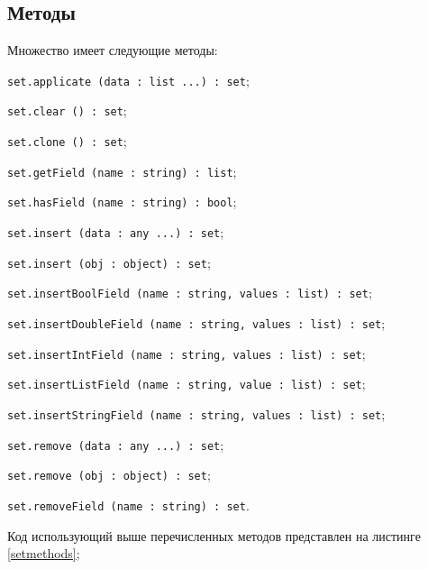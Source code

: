 \subsection{Методы}

Множество имеет следующие методы:
\begin{icItems}
\item \lstinline|set.applicate (data : list ...) : set|;
\item \lstinline|set.clear () : set|;
\item \lstinline|set.clone () : set|;
\item \lstinline|set.getField (name : string) : list|;
\item \lstinline|set.hasField (name : string) : bool|;
\item \lstinline|set.insert (data : any ...) : set|;
\item \lstinline|set.insert (obj : object) : set|;
\item \lstinline|set.insertBoolField (name : string, values : list) : set|;
\item \lstinline|set.insertDoubleField (name : string, values : list) : set|;
\item \lstinline|set.insertIntField (name : string, values : list) : set|;
\item \lstinline|set.insertListField (name : string, value : list) : set|;
\item \lstinline|set.insertStringField (name : string, values : list) : set|;
\item \lstinline|set.remove (data : any ...) : set|;
\item \lstinline|set.remove (obj : object) : set|;
\item \lstinline|set.removeField (name : string) : set|.
\end{icItems}

Код использующий выше перечисленных методов представлен на листинге \ref{setmethods};

